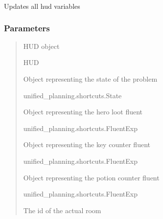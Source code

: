\documentclass[letterpaper,10pt,english]{sphinxmanual}
\begin{document}
\begin{fulllineitems}
\label{\detokenize{api_reference/dungeon_resolver/GUI:GUI.update_hud}}
\pysigstartsignatures
{}
\pysigstopsignatures
\sphinxAtStartPar
Updates all hud variables


\subsubsection{Parameters}
\label{\detokenize{api_reference/dungeon_resolver/GUI:id3}}\begin{quote}\begin{description}
\sphinxAtStartPar
HUD object

\sphinxAtStartPar
HUD

\sphinxAtStartPar
Object representing the state of the problem

\sphinxAtStartPar
unified\_planning.shortcuts.State

\sphinxAtStartPar
Object representing the hero loot fluent

\sphinxAtStartPar
unified\_planning.shortcuts.FluentExp

\sphinxAtStartPar
Object representing the key counter fluent

\sphinxAtStartPar
unified\_planning.shortcuts.FluentExp

\sphinxAtStartPar
Object representing the potion counter fluent

\sphinxAtStartPar
unified\_planning.shortcuts.FluentExp

\sphinxAtStartPar
The id of the actual room


\end{description}
\end{quote}
\end{fulllineitems}
\end{document}

